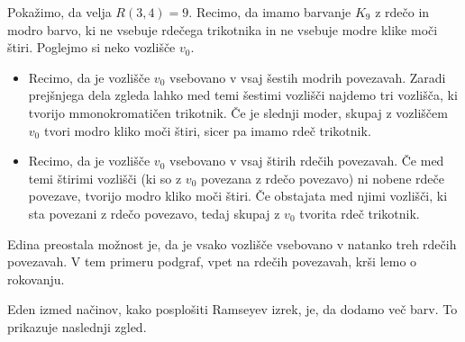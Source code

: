 \documentclass[twoside,11pt]{article}
\begin{document}
\begin{zgled}
    Pokažimo, da velja $R(3, 4) = 9$. Recimo, da imamo barvanje $K_9$ z rdečo in modro 
    barvo, ki ne vsebuje rdečega trikotnika in ne vsebuje modre klike moči štiri. Poglejmo 
    si neko vozlišče $v_0$. 
    \begin{itemize}
        \item Recimo, da je vozlišče $v_0$ vsebovano v vsaj šestih modrih povezavah. Zaradi 
        prejšnjega dela zgleda lahko med temi šestimi vozlišči najdemo tri vozlišča,
        ki tvorijo mmonokromatičen trikotnik. Če je slednji moder, skupaj z vozliščem $v_0$ tvori modro kliko moči 
        štiri, sicer pa imamo rdeč trikotnik.

        \item Recimo, da je vozlišče $v_0$ vsebovano v vsaj štirih rdečih povezavah. Če 
        med temi štirimi vozlišči (ki so z $v_0$ povezana z rdečo povezavo) ni nobene 
        rdeče povezave, tvorijo modro kliko moči štiri. Če obstajata med njimi vozlišči, 
        ki sta povezani z rdečo povezavo, tedaj skupaj z $v_0$ tvorita rdeč trikotnik.
    \end{itemize}
    
    Edina preostala možnost je, da je vsako vozlišče vsebovano v natanko treh rdečih povezavah. 
    V tem primeru podgraf, vpet na rdečih povezavah, krši lemo o rokovanju.
\end{zgled}

Eden izmed načinov, kako posplošiti Ramseyev izrek, je, da dodamo več barv. To prikazuje 
naslednji zgled. 
\end{document}

